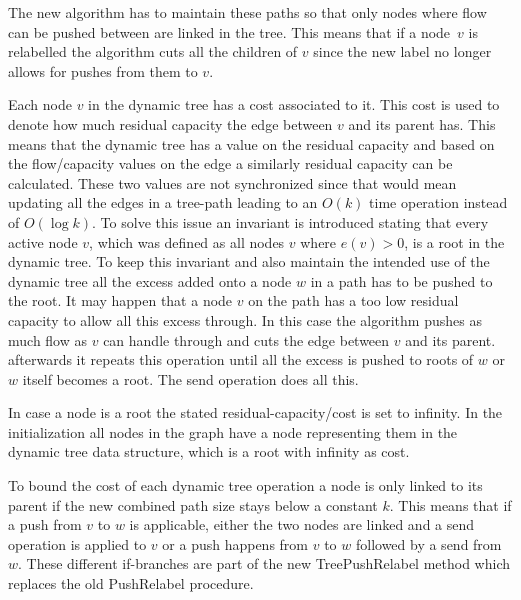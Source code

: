The new algorithm has to maintain these paths so that only nodes where flow can be pushed between are linked in the tree. This means that if a node~$v$ is relabelled
the algorithm cuts all the children of $v$ since the new label no longer allows for pushes from them to $v$. 

Each node $v$ in the dynamic tree has a cost associated to it. This cost is used to denote how much residual capacity the edge between $v$ and its parent has.
This means that the dynamic tree has a value on the residual capacity and based on the flow/capacity values on the edge a similarly residual capacity can be calculated.
These two values are not synchronized since that would mean updating all the edges in a tree-path leading to an $O(k)$ time operation instead of $O(\log{k})$.
To solve this issue an invariant is introduced stating that every active node $v$, which was defined as all nodes $v$ where $e(v) > 0$, is a root in the dynamic tree. To keep this invariant
and also maintain the intended use of the dynamic tree all the excess added onto a node $w$ in a path has to be pushed to the root. It may
happen that a node $v$ on the path has a too low residual capacity to allow all this excess through. In this case the algorithm pushes
as much flow as $v$ can handle through and cuts the edge between $v$ and its parent. afterwards it repeats this operation until all
the excess is pushed to roots of $w$ or $w$ itself becomes a root. The send operation does all this.

In case a node is a root the stated residual-capacity/cost is set to infinity. In the initialization all nodes in the graph have a node representing them
in the dynamic tree data structure, which is a root with infinity as cost.

To bound the cost of each dynamic tree operation a node is only linked to its parent if the new combined path size stays below a constant $k$. This means
that if a push from $v$ to $w$ is applicable, either the two nodes are linked and a send operation is applied to $v$ or a push happens from $v$ to $w$ followed by a send
from $w$. These different if-branches are part of the new TreePushRelabel method which replaces the old PushRelabel procedure.

